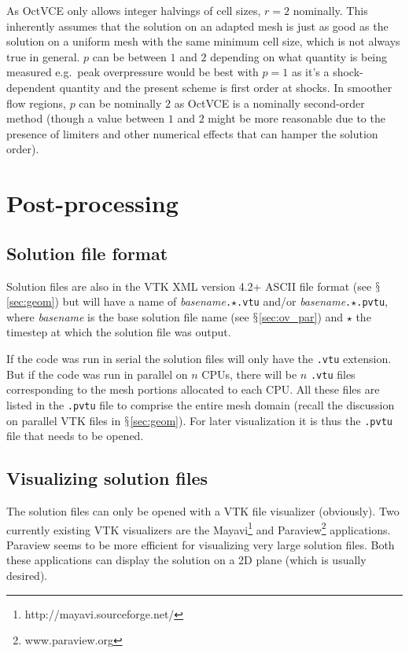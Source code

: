 \documentclass[pdftex, 12pt, a4paper]{report}
\begin{document}
As OctVCE only allows integer halvings of cell sizes, $r = 2$ nominally.  This inherently assumes that the solution on an
adapted mesh is just as good as the solution on a uniform mesh with the same minimum cell size, which is not always true in general.
$p$ can be between $1$ and $2$ depending on what quantity is being measured e.g.\ peak overpressure would be best
with $p = 1$ as it's a shock-dependent quantity and the present scheme is first order at shocks.  In smoother flow regions,
$p$ can be nominally $2$ as OctVCE is a nominally second-order method (though a value between $1$ and $2$ might be more reasonable due to
the presence of limiters and other numerical effects that can hamper the solution order).   

\chapter{Post-processing}\label{sec:post_proc}

\section{Solution file format}\label{sec:soln_file}

Solution files are also in the VTK XML version 4.2+ ASCII file format (see $\mathsection$\ref{sec:geom}) but will have a name of 
\emph{basename}\verb'.'$\star$\verb'.vtu' and/or \emph{basename}\verb'.'$\star$\verb'.pvtu', where \emph{basename} is
the base solution file name (see $\mathsection$\ref{sec:ov_par}) and $\star$ the timestep at which the solution file was output.  

If the code was run in serial the solution files will only have the \verb'.vtu' extension.  But if 
the code was run in parallel
on $n$ CPUs, there will be $n$ \verb'.vtu' files corresponding to the mesh portions allocated to each CPU.  All these files
are listed in the \verb'.pvtu' file to comprise the entire mesh domain (recall the discussion on parallel VTK files 
in $\mathsection$\ref{sec:geom}).  For later visualization it is thus the \verb'.pvtu' file that needs to be opened.

\section{Visualizing solution files}\label{sec:viz}

The solution files can only be opened with a VTK file visualizer (obviously).  Two currently existing VTK visualizers are
the Mayavi\footnote{http://mayavi.sourceforge.net/} and Paraview\footnote{www.paraview.org} applications.  Paraview seems to be more
efficient for visualizing very large solution files.  Both these applications can display the solution on a 2D plane (which is usually
desired).
\end{document}
